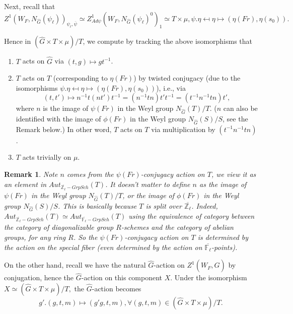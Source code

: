 \documentclass{article}
\newcommand{\red}[1]{\textcolor{red}{#1}}
\newtheorem*{remark}{Remark}
\begin{document}
	Next, recall that 
	$$Z^1(W_F, N_{\hat{G}}(\psi_{\ell}))_{\psi_{\ell}, \overline{\psi}} \simeq Z^1_{Ad\psi}(W_F, N_{\hat{G}}(\psi_{\ell})^0)_1 \simeq T \times \mu, \psi.\eta \mapsfrom \eta \mapsto (\eta(Fr), \eta(s_0)).$$
	
	Hence in $(\hat{G} \times T \times \mu)/T$, we compute by tracking the above isomorphisms that
	\begin{enumerate}
		\item $T$ acts on $\hat{G}$ via $(t, g) \mapsto gt^{-1}$.
		\item $T$ acts on $T$ (corresponding to $\eta(Fr)$) by twisted conjugacy (due to the isomorphisms $\psi.\eta \mapsfrom \eta \mapsto (\eta(Fr), \eta(s_0))$), i.e., via 
		$$(t, t') \mapsto n^{-1}t(nt')t^{-1}=(n^{-1}tn)t't^{-1}=(t^{-1}n^{-1}tn)t',$$
		where $n$ is the image of $\psi(Fr)$ 
		in the Weyl group $N_{\hat{G}}(T)/T$. ($n$ can also be identified with the image of $\phi(Fr)$ in the Weyl group $N_{\hat{G}}(S)/S$, see the Remark below.)
		In other word, $T$ acts on $T$ via multiplication by $(t^{-1}n^{-1}tn)$.
		\item $T$ acts trivially on $\mu$.
	\end{enumerate}
	
	\begin{remark}
		
		Note $n$ comes from the $\psi(Fr)$-conjugacy action on $T$, we view it as an element in $Aut_{\overline{\mathbb{Z}_{\ell}}-Grp Sch}(T)$. It doesn't matter to define $n$ as the image of $\psi(Fr)$ in the Weyl group $N_{\hat{G}}(T)/T$, or the image of $\phi(Fr)$ in the Weyl group $N_{\hat{G}}(S)/S$. This is basically because $T$ is split over $\overline{\mathbb{Z}_{\ell}}$. Indeed, $Aut_{\overline{\mathbb{Z}_{\ell}}-Grp Sch}(T) \simeq Aut_{\overline{\mathbb{F}_{\ell}}-Grp Sch}(T)$ using the equivalence of category between the category of diagonalizable group $R$-schemes and the category of abelian groups, for any ring $R$. So the $\psi(Fr)$-conjugacy action on $T$ is determined by the action on the special fiber (even determined by the action on $\overline{\mathbb{F}_\ell}$-points).
	\end{remark}
	
	On the other hand, recall we have the natural $\hat{G}$-action on $Z^1(W_F, \hat{G})$ by conjugation, hence the $\hat{G}$-action on this component $X$. Under the isomorphism 
	$X \simeq (\hat{G} \times T \times \mu)/T,$ the $\hat{G}$-action becomes
	$$g'.(g, t, m) \mapsto (g'g, t, m), \forall (g, t, m) \in (\hat{G} \times T \times \mu)/T.$$
	
\end{document}
